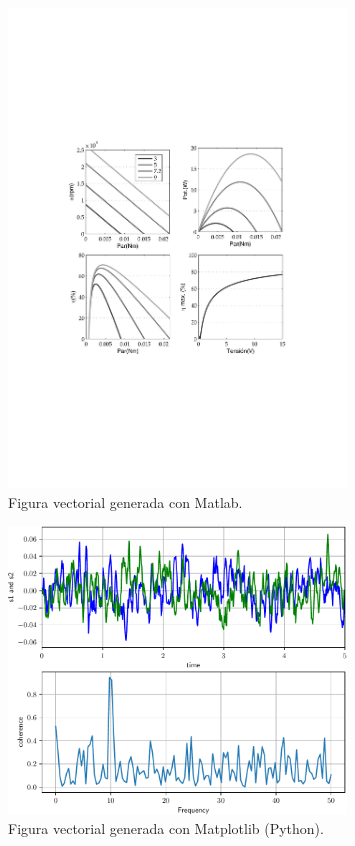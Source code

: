 \documentclass[11pt,a4paper]{article}
\begin{document}
\begin{figure}[H]
	\centering
	\includegraphics[width=0.8\textwidth]{matlabGrafs} 
	\caption[Gráfico de Matlab]{Figura vectorial generada con Matlab.}
	\label{fig:matlabGrafs}
\end{figure}

\begin{figure}[H]
	\centering
	\includegraphics[width=0.8\textwidth]{fig2_py}
	\caption[Figura hecha desde Python]{Figura vectorial generada con Matplotlib (Python).}
	\label{fig:python}
\end{figure}
\end{document}
